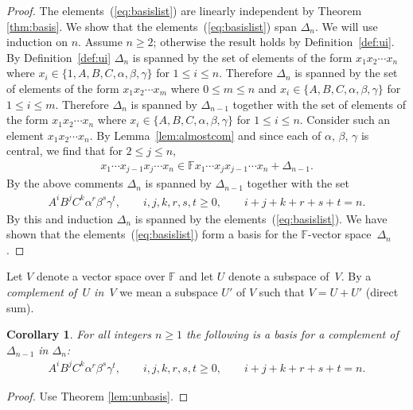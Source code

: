 \documentclass[pdftex]{sigma}
\numberwithin{equation}{section}
\newtheorem{Corollary}[Theorem]{Corollary}
\begin{document}
\begin{proof}
The elements~(\ref{eq:basislist}) are linearly independent by
Theorem
\ref{thm:basis}. We show that the
elements~(\ref{eq:basislist}) span $\Delta_n$.
We will use induction on $n$. Assume $n\geq 2$; otherwise
the result holds by Def\/inition~\ref{def:ui}.
By Def\/inition~\ref{def:ui} $\Delta_n$ is
spanned by the set of elements of the form
$x_1x_2\cdots x_n$
where $x_i \in \lbrace 1, A,B,C,\alpha,\beta,\gamma\rbrace$
for $1 \leq i \leq n$.
Therefore $\Delta_n$ is spanned by the set of elements
of the form
$x_1x_2\cdots x_m$ where $0 \leq m\leq n$ and
$x_i \in \lbrace A,B,C,\alpha,\beta,\gamma\rbrace$
for $1 \leq i \leq m$.
Therefore $\Delta_n$ is spanned by $\Delta_{n-1}$ together with
the set of elements
of the form
$x_1x_2\cdots x_n$ where
$x_i \in \lbrace A,B,C,\alpha,\beta,\gamma\rbrace$
for $1 \leq i \leq n$.
Consider such an element
$x_1x_2\cdots x_n$.
By Lemma~\ref{lem:almostcom} and since
each of $\alpha$, $\beta$, $\gamma$ is central,
we f\/ind that
for $2 \leq j \leq n$,
\begin{gather*}
x_1\cdots  x_{j-1}x_j\cdots  x_n \in
\mathbb F x_1\cdots x_{j}x_{j-1}\cdots  x_n + \Delta_{n-1}.
\end{gather*}
By the above comments
$\Delta_n$ is spanned by $\Delta_{n-1}$ together with the
set
\begin{gather*}
A^iB^jC^k\alpha^r \beta^s \gamma^t, \qquad
i,j,k,r,s,t\geq 0, \qquad
i+j+k+r+s+t = n.
\end{gather*}
By this and induction
$\Delta_n$ is spanned by the elements~(\ref{eq:basislist}).
We have shown that
the elements~(\ref{eq:basislist}) form a basis  for the $\mathbb F$-vector space~$\Delta_n$.
\end{proof}

  Let $V$ denote a vector space over
$\mathbb F$ and let $U$ denote a subspace of~$V$.
By a {\it complement of~$U$ in~$V$} we mean
a subspace $U'$ of $V$ such that
$V=U+U'$ (direct sum).


\begin{Corollary}
\label{lem:com}
For all integers $n\geq 1$ the following is a basis
for a complement of $\Delta_{n-1}$ in $\Delta_n$:
\begin{gather*}
A^iB^jC^k\alpha^r \beta^s \gamma^t, \qquad
i,j,k,r,s,t\geq 0, \qquad
i+j+k+r+s+t = n.
\end{gather*}
\end{Corollary}
\begin{proof}
Use Theorem
\ref{lem:unbasis}.
\end{proof}
\end{document}
